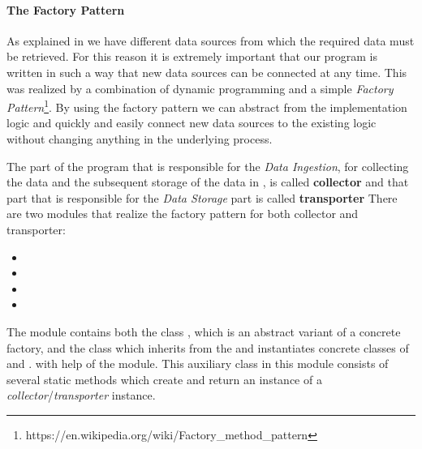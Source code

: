 \paragraph{The Factory Pattern}
\label{par:factory}
As explained in  we have different data sources from which the required data must be retrieved.
For this reason it is extremely important that our program is written in such a way that new data sources can be connected at any time.
This was realized by a combination of dynamic programming and a simple \textit{Factory Pattern}\footnote{https://en.wikipedia.org/wiki/Factory_method_pattern}.
By using the factory pattern we can abstract from the implementation logic and quickly and easily connect new data sources to the existing logic without changing anything in the underlying process.

The part of the program that is responsible for the \textit{Data Ingestion}, \ie for collecting the data and the subsequent storage of the data in \gds{}, is called \textbf{collector}
and that part that is responsible for the \textit{Data Storage} part is called \textbf{transporter}
There are two modules that realize the factory pattern for both collector and transporter:

\begin{itemize}
  \item {}
  \item {}
  \item {}
  \item {}
\end{itemize}

The module  contains both the class , which is an abstract variant of a concrete factory, and the class
 which inherits from the  and instantiates concrete classes of  and .
with help of the  module.
This auxiliary class in this module consists of several static methods which create and return an instance of a \textit{collector}/\textit{transporter} instance.
